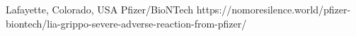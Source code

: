           {Lafayette, Colorado, USA}
          {}
          {Pfizer/BioNTech}
          {}
          {}
          {https://nomoresilence.world/pfizer-biontech/lia-grippo-severe-adverse-reaction-from-pfizer/}

